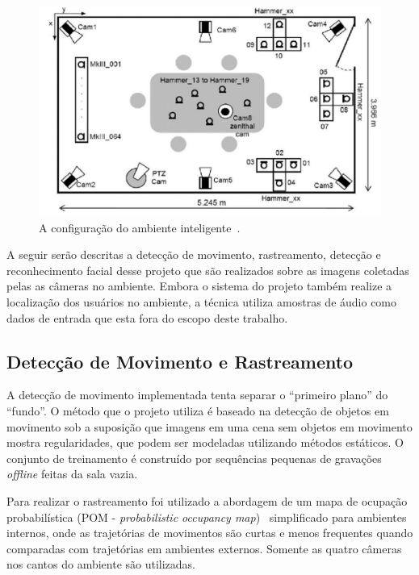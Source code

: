 	\begin{figure}[hbt]
		\begin{center}
			\includegraphics[scale=0.4]{figuras/3.TrabalhosCorrelatos/upc.png}
		\end{center}
		\caption{A configuração do ambiente inteligente~\cite{salah}.}
		\label{upc}
	\end{figure}


A seguir serão descritas a detecção de movimento, rastreamento, detecção e reconhecimento facial desse projeto que são realizados sobre as imagens coletadas pelas as câmeras no ambiente. Embora o sistema do projeto também realize a localização dos usuários no ambiente, a técnica utiliza amostras de áudio como dados de entrada que esta fora do escopo deste trabalho.

\subsection{Detecção de Movimento e Rastreamento}

A detecção de movimento implementada tenta separar o ``primeiro plano'' do ``fundo''. O método que o projeto utiliza é baseado na detecção de objetos em movimento sob a suposição que imagens em uma cena sem objetos em movimento mostra regularidades, que podem ser modeladas utilizando métodos estáticos. O conjunto de treinamento é construído por sequências pequenas de gravações \textit{offline} feitas da sala vazia.

Para realizar o rastreamento foi utilizado a abordagem de um mapa de ocupação probabilística (POM - \textit{probabilistic occupancy map})~\cite{pom} simplificado para ambientes internos, onde as trajetórias de movimentos são curtas e menos frequentes quando comparadas com trajetórias em ambientes externos. Somente as quatro câmeras nos cantos do ambiente são utilizadas.

